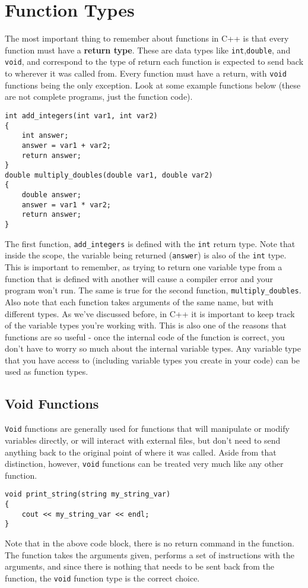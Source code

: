 \section{Function Types}
The most important thing to remember about functions in C++ is that every function must have a \textbf{return type}.  These are data types like \texttt{int},\texttt{double}, and \texttt{void}, and correspond to the type of return each function is expected to send back to wherever it was called from.  Every function must have a return, with \texttt{void} functions being the only exception.  Look at some example functions below (these are not complete programs, just the function code).

\begin{verbatim}
int add_integers(int var1, int var2)
{ 
    int answer;
    answer = var1 + var2;
    return answer;
}
double multiply_doubles(double var1, double var2)
{ 
    double answer;
    answer = var1 * var2;
    return answer;
}
\end{verbatim}

The first function, \texttt{add\_integers} is defined with the \texttt{int} return type.  Note that inside the scope, the variable being returned (\texttt{answer}) is also of the \texttt{int} type.  This is important to remember, as trying to return one variable type from a function that is defined with another will cause a compiler error and your program won't run.  The same is true for the second function, \texttt{multiply\_doubles}.  Also note that each function takes arguments of the same name, but with different types.  As we've discussed before, in C++ it is important to keep track of the variable types you're working with.  This is also one of the reasons that functions are so useful - once the internal code of the function is correct, you don't have to worry so much about the internal variable types.  Any variable type that you have access to (including variable types you create in your code) can be used as function types.

\subsection*{Void Functions}
\texttt{Void} functions are generally used for functions that will manipulate or modify variables directly, or will interact with external files, but don't need to send anything back to the original point of where it was called.  Aside from that distinction, however, \texttt{void} functions can be treated very much like any other function.

\begin{verbatim}
void print_string(string my_string_var)
{
    cout << my_string_var << endl;
}
\end{verbatim}

Note that in the above code block, there is no return command in the function.  The function takes the arguments given, performs a set of instructions with the arguments, and since there is nothing that needs to be sent back from the function, the \texttt{void} function type is the correct choice.
